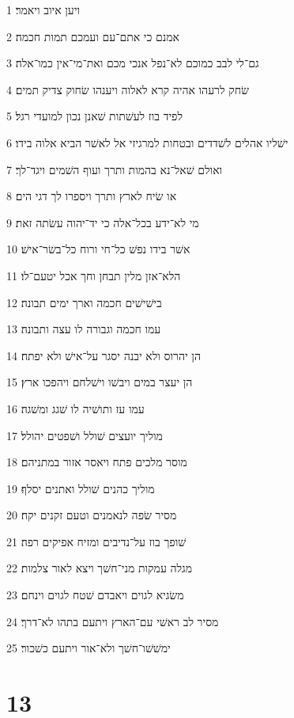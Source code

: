 \par 1 ויען איוב ויאמר׃
\par 2 אמנם כי אתם־עם ועמכם תמות חכמה׃
\par 3 גם־לי לבב כמוכם לא־נפל אנכי מכם ואת־מי־אין כמו־אלה׃
\par 4 שׂחק לרעהו אהיה קרא לאלוה ויענהו שׂחוק צדיק תמים׃
\par 5 לפיד בוז לעשׁתות שׁאנן נכון למועדי רגל׃
\par 6 ישׁליו אהלים לשׁדדים ובטחות למרגיזי אל לאשׁר הביא אלוה בידו׃
\par 7 ואולם שׁאל־נא בהמות ותרך ועוף השׁמים ויגד־לך׃
\par 8 או שׂיח לארץ ותרך ויספרו לך דגי הים׃
\par 9 מי לא־ידע בכל־אלה כי יד־יהוה עשׂתה זאת׃
\par 10 אשׁר בידו נפשׁ כל־חי ורוח כל־בשׂר־אישׁ׃
\par 11 הלא־אזן מלין תבחן וחך אכל יטעם־לו׃
\par 12 בישׁישׁים חכמה וארך ימים תבונה׃
\par 13 עמו חכמה וגבורה לו עצה ותבונה׃
\par 14 הן יהרוס ולא יבנה יסגר על־אישׁ ולא יפתח׃
\par 15 הן יעצר במים ויבשׁו וישׁלחם ויהפכו ארץ׃
\par 16 עמו עז ותושׁיה לו שׁגג ומשׁגה׃
\par 17 מוליך יועצים שׁולל ושׁפטים יהולל׃
\par 18 מוסר מלכים פתח ויאסר אזור במתניהם׃
\par 19 מוליך כהנים שׁולל ואתנים יסלף׃
\par 20 מסיר שׂפה לנאמנים וטעם זקנים יקח׃
\par 21 שׁופך בוז על־נדיבים ומזיח אפיקים רפה׃
\par 22 מגלה עמקות מני־חשׁך ויצא לאור צלמות׃
\par 23 משׂגיא לגוים ויאבדם שׁטח לגוים וינחם׃
\par 24 מסיר לב ראשׁי עם־הארץ ויתעם בתהו לא־דרך׃
\par 25 ימשׁשׁו־חשׁך ולא־אור ויתעם כשׁכור׃

\chapter{13}

